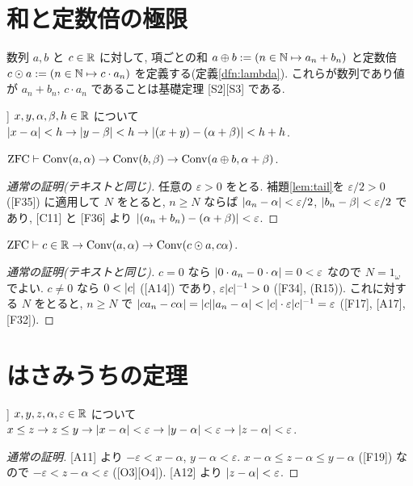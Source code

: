 \section{和と定数倍の極限}

数列 $a, b$ と $c \in \mathbb{R}$ に対して, 項ごとの和 $a \oplus b := (n \in \mathbb{N} \mapsto a_n + b_n)$ と定数倍 $c \odot a := (n \in \mathbb{N} \mapsto c \cdot a_n)$ を定義する(定義\ref{dfn:lambda}). これらが数列であり値が $a_n + b_n$, $c \cdot a_n$ であることは基礎定理 [S2][S3] である.

\begin{lem}[[C11]]
  $x, y, \alpha, \beta, h \in \mathbb{R}$ について $\lvert x - \alpha\rvert < h \to \lvert y - \beta\rvert < h \to \lvert (x + y) - (\alpha + \beta)\rvert < h + h$.
\end{lem}

\begin{thm}\label{thm:lim-sum}
  $\mathrm{ZFC} \vdash \mathrm{Conv}(a, \alpha) \to \mathrm{Conv}(b, \beta) \to \mathrm{Conv}(a \oplus b, \alpha + \beta)$.
\end{thm}
\begin{proof}[通常の証明(テキストと同じ)]
  任意の $\varepsilon > 0$ をとる. 補題\ref{lem:tail}を $\varepsilon/2 > 0$ ([F35]) に適用して $N$ をとると, $n \geq N$ ならば $\lvert a_n - \alpha\rvert < \varepsilon/2$, $\lvert b_n - \beta\rvert < \varepsilon/2$ であり, [C11] と [F36] より $\lvert (a_n + b_n) - (\alpha + \beta)\rvert < \varepsilon$.
\end{proof}

\begin{thm}\label{thm:lim-scalar}
  $\mathrm{ZFC} \vdash c \in \mathbb{R} \to \mathrm{Conv}(a, \alpha) \to \mathrm{Conv}(c \odot a, c\alpha)$.
\end{thm}
\begin{proof}[通常の証明(テキストと同じ)]
  $c = 0$ なら $\lvert 0 \cdot a_n - 0 \cdot \alpha\rvert = 0 < \varepsilon$ なので $N = 1_\omega$ でよい. $c \neq 0$ なら $0 < \lvert c\rvert$ ([A14]) であり, $\varepsilon \lvert c\rvert^{-1} > 0$ ([F34], (R15)). これに対する $N$ をとると, $n \geq N$ で $\lvert c a_n - c\alpha\rvert = \lvert c\rvert\lvert a_n - \alpha\rvert < \lvert c\rvert \cdot \varepsilon\lvert c\rvert^{-1} = \varepsilon$ ([F17], [A17], [F32]).
\end{proof}

\section{はさみうちの定理}

\begin{lem}[[C12]]
  $x, y, z, \alpha, \varepsilon \in \mathbb{R}$ について $x \leq z \to z \leq y \to \lvert x - \alpha\rvert < \varepsilon \to \lvert y - \alpha\rvert < \varepsilon \to \lvert z - \alpha\rvert < \varepsilon$.
\end{lem}
\begin{proof}[通常の証明]
  [A11] より $-\varepsilon < x - \alpha$, $y - \alpha < \varepsilon$. $x - \alpha \leq z - \alpha \leq y - \alpha$ ([F19]) なので $-\varepsilon < z - \alpha < \varepsilon$ ([O3][O4]). [A12] より $\lvert z - \alpha\rvert < \varepsilon$.
\end{proof}

